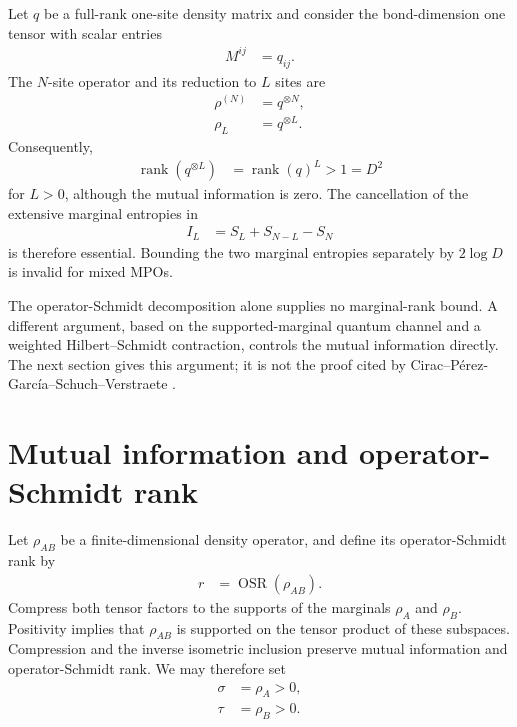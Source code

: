 \documentclass[11pt]{article}
\begin{document}
Let $q$ be a full-rank one-site density matrix and consider the bond-dimension
one tensor with scalar entries
\begin{align}
    M^{ij}
        &= q_{ij}.
    \label{eq:cpgsv17_product_tensor_entries}
\end{align}
The $N$-site operator and its reduction to $L$ sites are
\begin{align}
    \rho^{(N)}
        &= q^{\otimes N},
    \label{eq:cpgsv17_product_chain_operator}\\
    \rho_L
        &= q^{\otimes L}.
    \label{eq:cpgsv17_product_reduced_operator}
\end{align}
Consequently,
\begin{align}
    \operatorname{rank}(q^{\otimes L})
        &= \operatorname{rank}(q)^L
        > 1
        = D^2
    \label{eq:cpgsv17_product_marginal_rank}
\end{align}
for $L>0$, although the mutual information is zero. The cancellation of the
extensive marginal entropies in
\begin{align}
    I_L
        &= S_L+S_{N-L}-S_N
    \label{eq:cpgsv17_mutual_information_entropy_difference}
\end{align}
is therefore essential. Bounding the two marginal entropies separately by
$2\log D$ is invalid for mixed MPOs.

The operator-Schmidt decomposition alone supplies no marginal-rank bound. A
different argument, based on the supported-marginal quantum channel and a
weighted Hilbert--Schmidt contraction, controls the mutual information
directly. The next section gives this argument; it is not the proof cited by
Cirac--P\'erez-Garc\'ia--Schuch--Verstraete
\cite{Cirac2016MPDO_arXiv}.

\section{Mutual information and operator-Schmidt rank}

Let $\rho_{AB}$ be a finite-dimensional density operator, and define its
operator-Schmidt rank by
\begin{align}
    r
        &= \operatorname{OSR}(\rho_{AB}).
    \label{eq:cpgsv17_operator_schmidt_rank_definition}
\end{align}
Compress both tensor factors to the supports of the marginals $\rho_A$ and
$\rho_B$. Positivity implies that $\rho_{AB}$ is supported on the tensor
product of these subspaces. Compression and the inverse isometric inclusion
preserve mutual information and operator-Schmidt rank. We may therefore set
\begin{align}
    \sigma
        &= \rho_A>0,
    \label{eq:cpgsv17_faithful_first_marginal}\\
    \tau
        &= \rho_B>0.
    \label{eq:cpgsv17_faithful_second_marginal}
\end{align}
\end{document}
